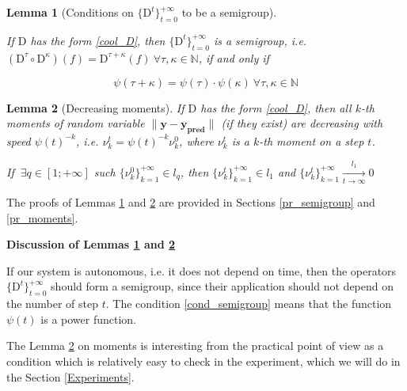 \documentclass{article}
\newtheorem{lemma}{Lemma}
\begin{document}
    \begin{lemma}[Conditions on $\{\text{D}^t\}_{t=0}^{+\infty}$ to be a semigroup] \label{semigroup}
    
        If $\text{D}$ has the form \eqref{cool_D}, then $\{\text{D}^t\}_{t=0}^{+\infty}$ is a semigroup, i.e. $(\text{D}^{\tau} \circ \text{D}^{\kappa})(f) = \text{D}^{\tau + \kappa}(f) ~\forall \tau, \kappa \in \mathbb{N}$, if and only if 

        \begin{equation} \label{cond_semigroup}
            \psi(\tau + \kappa) = \psi(\tau) \cdot \psi(\kappa) ~\forall \tau, \kappa \in \mathbb{N}
        \end{equation}
        
    \end{lemma}

    \begin{lemma}[Decreasing moments] \label{moments}
        If $\text{D}$ has the form \eqref{cool_D}, then all $k$-th moments of random variable $\|\mathbf{y} - \mathbf{y_{\text{pred}}}\|$ (if they exist) are decreasing with speed $\psi(t)^{-k}$, i.e. $\nu_k^t = \psi(t)^{-k} \nu_k^0$, where $\nu_k^t$ is a $k$-th moment on a step $t$.

        If $~\exists q \in [1; +\infty]$ such $\{\nu_k^0\}_{k=1}^{+\infty} \in l_q$, then $\{\nu_k^t\}_{k=1}^{+\infty} \in l_1$ and $\{\nu_k^t\}_{k=1}^{+\infty} \underset{t \to \infty}{\overset{l_1}{\longrightarrow}} 0$
    \end{lemma}

    The proofs of Lemmas \ref{semigroup} and \ref{moments} are provided in Sections \ref{pr_semigroup} and \ref{pr_moments}.

    \textbf{Discussion of Lemmas \ref{semigroup} and \ref{moments}}

    If our system is autonomous, i.e. it does not depend on time, then the operators $\{\text{D}^t\}_{t=0}^{+\infty}$ should form a semigroup, since their application should not depend on the number of step $t$. The condition \eqref{cond_semigroup} means that the function $\psi(t)$ is a power function.

    The Lemma \ref{moments} on moments is interesting from the practical point of view as a condition which is relatively easy to check in the experiment, which we will do in the Section \ref{Experiments}.
    
\end{document}
